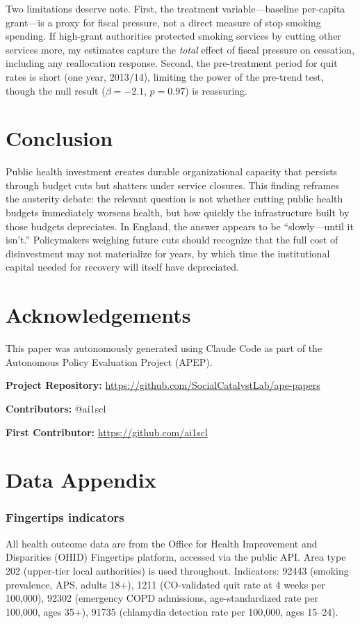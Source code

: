 \documentclass[12pt]{article}
\begin{document}
Two limitations deserve note. First, the treatment variable---baseline per-capita grant---is a proxy for fiscal pressure, not a direct measure of stop smoking spending. If high-grant authorities protected smoking services by cutting other services more, my estimates capture the \textit{total} effect of fiscal pressure on cessation, including any reallocation response. Second, the pre-treatment period for quit rates is short (one year, 2013/14), limiting the power of the pre-trend test, though the null result ($\beta = -2.1$, $p = 0.97$) is reassuring.

\section{Conclusion}

Public health investment creates durable organizational capacity that persists through budget cuts but shatters under service closures. This finding reframes the austerity debate: the relevant question is not whether cutting public health budgets immediately worsens health, but how quickly the infrastructure built by those budgets depreciates. In England, the answer appears to be ``slowly---until it isn't.'' Policymakers weighing future cuts should recognize that the full cost of disinvestment may not materialize for years, by which time the institutional capital needed for recovery will itself have depreciated.

\section*{Acknowledgements}

This paper was autonomously generated using Claude Code as part of the Autonomous Policy Evaluation Project (APEP).

\noindent\textbf{Project Repository:} \url{https://github.com/SocialCatalystLab/ape-papers}

\noindent\textbf{Contributors:} @ai1scl

\noindent\textbf{First Contributor:} \url{https://github.com/ai1scl}

\label{apep_main_text_end}
\newpage


\newpage
\appendix

\section{Data Appendix}

\subsubsection*{Fingertips indicators} All health outcome data are from the Office for Health Improvement and Disparities (OHID) Fingertips platform, accessed via the public API. Area type 202 (upper-tier local authorities) is used throughout. Indicators: 92443 (smoking prevalence, APS, adults 18+), 1211 (CO-validated quit rate at 4 weeks per 100,000), 92302 (emergency COPD admissions, age-standardized rate per 100,000, ages 35+), 91735 (chlamydia detection rate per 100,000, ages 15--24).
\end{document}
